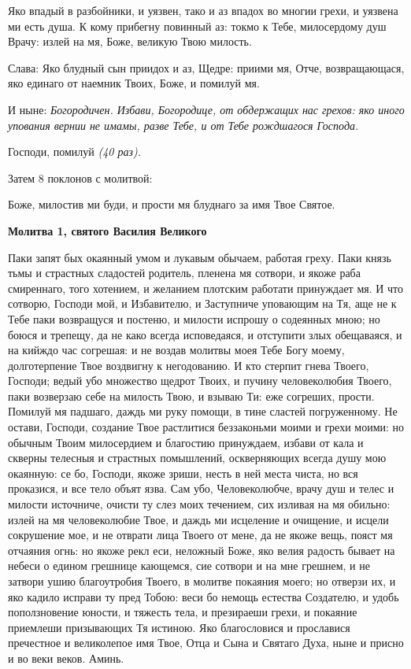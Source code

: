 Яко впадый в разбойники, и уязвен, тако и аз впадох во многии грехи, и уязвена ми есть душа. К кому прибегну повинный аз: токмо к Тебе, милосердому душ Врачу: излей на мя, Боже, великую Твою милость. 


Слава: Яко блудный сын приидох и аз, Щедре: приими мя, Отче, возвращающася, яко единаго от наемник Твоих, Боже, и помилуй мя.


И ныне: \itshape Богородичен\normalfont{}. Избави, Богородице, от обдержащих нас грехов: яко иного упования вернии не имамы, разве Тебе, и от Тебе рождшагося Господа.


Господи, помилуй \itshape (40 раз).\normalfont{}


Затем 8 поклонов с молитвой: 

Боже, милостив ми буди, и прости мя блуднаго за имя Твое Святое.


\medskip


\bfseries Молитва 1, святого Василия Великого

\normalfont{}Паки запят бых окаянный умом и лукавым обычаем, работая греху. Паки князь тьмы и страстных сладостей родитель, пленена мя сотвори, и якоже раба смиреннаго, того хотением, и желанием плотским работати принуждает мя. И что сотворю, Господи мой, и Избавителю, и Заступниче уповающим на Тя, аще не к Тебе паки возвращуся и постеню, и милости испрошу о содеянных мною; но боюся и трепещу, да не како всегда исповедаяся, и отступити злых обещаваяся, и на кийждо час согрешая: и не воздав молитвы моея Тебе Богу моему, долготерпение Твое воздвигну к негодованию. И кто стерпит гнева Твоего, Господи; ведый убо множество щедрот Твоих, и пучину человеколюбия Твоего, паки возверзаю себе на милость Твою, и взываю Ти: еже согреших, прости. Помилуй мя падшаго, даждь ми руку помощи, в тине сластей погруженному. Не остави, Господи, создание Твое растлитися беззаконьми моими и грехи моими: но обычным Твоим милосердием и благостию принуждаем, избави от кала и скверны телесныя и страстных помышлений, оскверняющих всегда душу мою окаянную: се бо, Господи, якоже зриши, несть в ней места чиста, но вся проказися, и все тело объят язва. Сам убо, Человеколюбче, врачу душ и телес и милости источниче, очисти ту слез моих течением, сих изливая на мя обильно: излей на мя человеколюбие Твое, и даждь ми исцеление и очищение, и исцели сокрушение мое, и не отврати лица Твоего от мене, да не якоже вещь, пояст мя отчаяния огнь: но якоже рекл еси, неложный Боже, яко велия радость бывает на небеси о едином грешнице кающемся, сие сотвори и на мне грешнем, и не затвори ушию благоутробия Твоего, в молитве покаяния моего; но отверзи их, и яко кадило исправи ту пред Тобою: веси бо немощь естества Создателю, и удобь поползновение юности, и тяжесть тела, и презираеши грехи, и покаяние приемлеши призывающих Тя истиною. Яко благословися и прославися пречестное и великолепое имя Твое, Отца и Сына и Святаго Духа, ныне и присно и во веки веков. Аминь.


